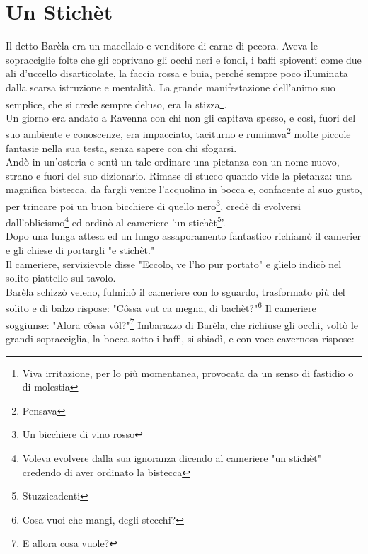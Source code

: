 
\chapter{Un Stichèt}
Il detto Barèla era un macellaio e venditore di carne di pecora. Aveva le sopracciglie folte che gli coprivano gli occhi neri e fondi, i baffi spioventi come due ali d'uccello disarticolate, la faccia rossa e buia, perché sempre poco illuminata dalla scarsa istruzione e mentalità. La grande manifestazione dell'animo suo semplice, che si crede sempre deluso, era la stizza\footnote{Viva irritazione, per lo più momentanea, provocata da un senso di fastidio o di molestia}. \\
Un giorno era andato a Ravenna con chi non gli capitava spesso, e così, fuori del suo ambiente e conoscenze, era impacciato, taciturno e ruminava\footnote{Pensava} molte piccole fantasie nella sua testa, senza sapere con chi sfogarsi.\\
Andò in un'osteria e sentì un tale ordinare una pietanza con un nome nuovo, strano e fuori del suo dizionario. Rimase di stucco quando vide la pietanza: una magnifica bistecca, da fargli venire l'acquolina in bocca e, confacente al suo gusto, per trincare poi un buon bicchiere di quello nero\footnote{Un bicchiere di vino rosso}, credè di evolversi dall'oblicismo\footnote{Voleva evolvere dalla sua ignoranza dicendo al cameriere "un stichèt" credendo di aver ordinato la bistecca} ed ordinò al cameriere 'un stichèt\footnote{Stuzzicadenti}'. \\
Dopo una lunga attesa ed un lungo assaporamento fantastico richiamò il camerier e gli chiese di portargli "e stichèt."\\
Il cameriere, servizievole disse "Eccolo, ve l'ho pur portato" e glielo indicò nel solito piattello sul tavolo.\\
Barèla schizzò veleno, fulminò il cameriere con lo sguardo, trasformato più del solito e di balzo rispose: "Côssa vut ca megna, di bachèt?"\footnote{Cosa vuoi che mangi, degli stecchi?}
Il cameriere soggiunse: "Alora côssa vôl?"\footnote{E allora cosa vuole?}
Imbarazzo di Barèla, che richiuse gli occhi, voltò le grandi sopracciglia, la bocca sotto i baffi, si sbiadì, e con voce cavernosa rispose: \\
